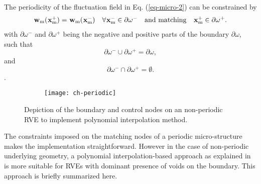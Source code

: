 The periodicity of the fluctuation field in Eq. (\ref{eq-micro-2}) can be constrained by
\begin{eqnarray}\label{eq-periodic-2}
\begin{array}{l l l l}
\tgmm[]{w}(\tgmm[]{x}^+)=\tgmm[]{w}(\tgmm[]{x}^-) & \forall\tgmm[]{x}^-\in\partial\omega^- & \text{and matching} & \tgmm[]{x}^+\in\partial\omega^+.
\end{array}
\end{eqnarray}
with $ \partial\omega^- $ and $ \partial\omega^+ $ being the negative and positive parts of the boundary $ \partial\omega $, such that
\begin{equation}\label{eq-perioidic-3}
\partial\omega^-\cup\partial\omega^+=\partial\omega,
\end{equation}
and
\begin{equation}\label{eq-perioidic-4}
\partial\omega^-\cap\partial\omega^+=\emptyset.
\end{equation}.

\begin{figure}
	\centering
	\begin{subfigure}[t]{0.5\textwidth}
		\texttt{[image: ch-periodic]}
	\end{subfigure}
	\caption{Depiction of the boundary and control nodes on an non-periodic RVE to implement polynomial interpolation method.}\label{fig-ch-periodic}
\end{figure}

The constraints imposed on the matching nodes of a periodic micro-structure makes the implementation straightforward. However in the case of non-periodic underlying geometry, a polynomial interpolation-based approach as explained in \cite{nguyenImposingPeriodicBoundary2012,nguyenComputationalHomogenizationCellular2014} is more suitable for RVEs with dominant presence of voids on the boundary. This approach is briefly summarized here. 

